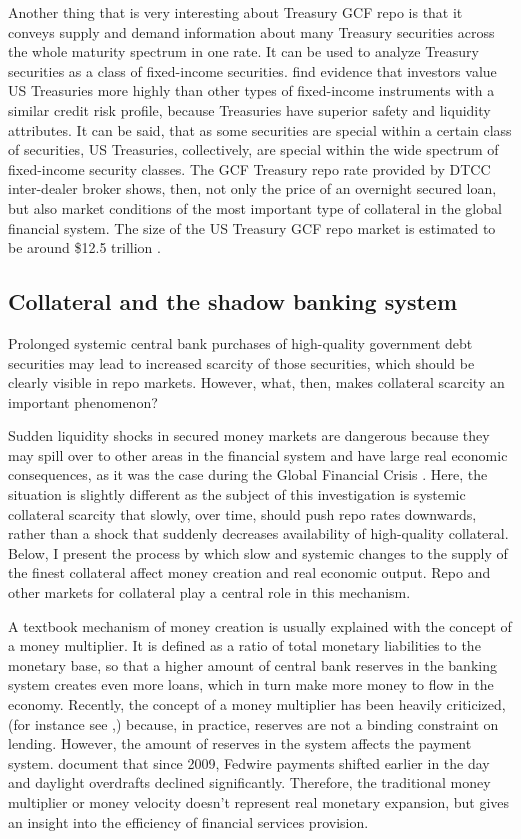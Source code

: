 \documentclass[11pt,a4paper,english,oneside]{article}
\begin{document}
Another thing that is very interesting about Treasury GCF repo is that it conveys supply and demand information about many Treasury securities across the whole maturity spectrum in one rate. It can be used to analyze Treasury securities as a class of fixed-income securities. \citet{krishnamurthy2012} find evidence that investors value US Treasuries more highly than other types of fixed-income instruments with a similar credit risk profile, because Treasuries have superior safety and liquidity attributes. It can be said, that as some securities are special within a certain class of securities, US Treasuries, collectively, are special within the wide spectrum of fixed-income security classes. The GCF Treasury repo rate provided by DTCC inter-dealer broker shows, then, not only the price of an overnight secured loan, but also market conditions of the most important type of collateral in the global financial system. The size of the US Treasury GCF repo market is estimated to be around \$12.5 trillion \citep{sifma2022}.

\subsection{Collateral and the shadow banking system}

Prolonged systemic central bank purchases of high-quality government debt securities may lead to increased scarcity of those securities, which should be clearly visible in repo markets. However, what, then, makes collateral scarcity an important phenomenon?

Sudden liquidity shocks in secured money markets are dangerous because they may spill over to other areas in the financial system and have large real economic consequences, as it was the case during the Global Financial Crisis \citep{gorton2009}. Here, the situation is slightly different as the subject of this investigation is systemic collateral scarcity that slowly, over time, should push repo rates downwards, rather than a shock that suddenly decreases availability of high-quality collateral. Below, I present the process by which slow and systemic changes to the supply of the finest collateral affect money creation and real economic output. Repo and other markets for collateral play a central role in this mechanism.

A textbook mechanism of money creation is usually explained with the concept of a money multiplier. It is defined as a ratio of total monetary liabilities to the monetary base, so that a higher amount of central bank reserves in the banking system creates even more loans, which in turn make more money to flow in the economy. Recently, the concept of a money multiplier has been heavily criticized, (for instance see \citet{boe2014},) because, in practice, reserves are not a binding constraint on lending. However, the amount of reserves in the system affects the payment system. \citet{badev2021} document that since 2009, Fedwire payments shifted earlier in the day and daylight overdrafts declined significantly. Therefore, the traditional money multiplier or money velocity doesn't represent real monetary expansion, but gives an insight into the efficiency of financial services provision.
\end{document}
